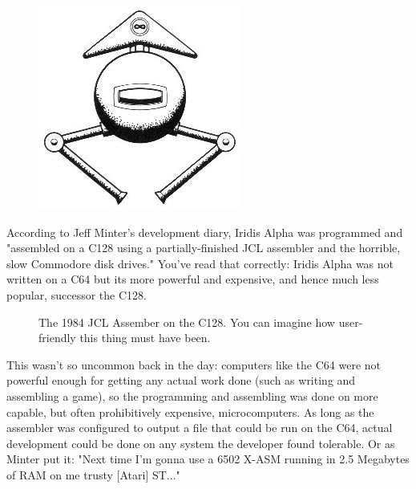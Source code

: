 \begin{definition}
\setlength{\intextsep}{0pt}%
\setlength{\columnsep}{3pt}%
\begin{figure}
\includegraphics[width=\linewidth]{src/callout/ia.jpg} 
\end{figure}
\small

According to Jeff Minter's development diary, Iridis Alpha was programmed and "assembled
on a C128 using a partially-finished JCL assembler and the horrible, slow
Commodore disk drives." 
You've read that correctly: Iridis Alpha was not written
on a C64 but its more powerful and expensive, and hence much less popular, successor
the C128. 
  \vspace{0.2cm}
\begin{figure}[H]
  {
    \begin{adjustbox}{width=7cm,center}
    \end{adjustbox}
  }\caption*{The 1984 JCL Assember on the C128. You can imagine how user-friendly this thing must have been.}
\end{figure}
This wasn't so uncommon back in the day: computers like the C64 were not
powerful enough for getting any actual work done (such as writing and assembling a game),
so the programming and assembling was done on more capable, but often prohibitively expensive,
microcomputers. As long as the assembler was configured to output a file that could be run on
the C64, actual development could be done on any system the developer found tolerable. Or as
  Minter put it: "Next time I'm gonna use a 6502 X-ASM running in 2.5 Megabytes of RAM on 
  me trusty [Atari] ST..."
\end{definition}

